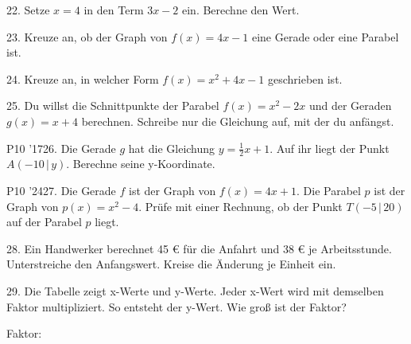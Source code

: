 \documentclass[11pt]{article}
\begin{document}
\pfgruppe{}
\begin{pfaufg}{}{22.}{}
Setze $x = 4$ in den Term $3x - 2$ ein. Berechne den Wert.
\end{pfaufg}
\begin{pfaufg}{}{23.}{}
Kreuze an, ob der Graph von $f(x) = 4x - 1$ eine Gerade oder eine Parabel ist.
\end{pfaufg}
\begin{pfaufg}{}{24.}{}
Kreuze an, in welcher Form $f(x) = x^2 + 4x - 1$ geschrieben ist.
\end{pfaufg}
\begin{pfaufg}{}{25.}{}
Du willst die Schnittpunkte der Parabel $f(x) = x^2 - 2x$ und der Geraden $g(x) = x + 4$ berechnen. Schreibe nur die Gleichung auf, mit der du anfängst.
\par\noindent \leerfeld[=]  \leerfeld \par
{}
\end{pfaufg}
\pfgruppe{}
\begin{pfaufg}{P10 ’17}{26.}{}
Die Gerade $g$ hat die Gleichung $y = \tfrac{1}{2}x + 1$. Auf ihr liegt der Punkt $A(-10\,|\,y)$. Berechne seine y-Koordinate.
\end{pfaufg}
\pfgruppe{}
\begin{pfaufg}{P10 ’24}{27.}{}
Die Gerade $f$ ist der Graph von $f(x) = 4x + 1$. Die Parabel $p$ ist der Graph von $p(x) = x^2 - 4$. Prüfe mit einer Rechnung, ob der Punkt $T(-5\,|\,20)$ auf der Parabel $p$ liegt.
\end{pfaufg}
\pfgruppe{}
\begin{pfaufg}{}{28.}{}
Ein Handwerker berechnet 45 € für die Anfahrt und 38 € je Arbeitsstunde. Unterstreiche den Anfangswert. Kreise die Änderung je Einheit ein.
\end{pfaufg}
\begin{pfaufg}{}{29.}{}
Die Tabelle zeigt x-Werte und y-Werte. Jeder x-Wert wird mit demselben Faktor multipliziert. So entsteht der y-Wert. Wie groß ist der Faktor?
\par\smallskip\noindent {}\par
\par\noindent Faktor: \leerfeld \par
{}
\end{pfaufg}
\end{document}
